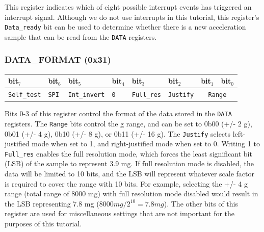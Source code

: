 \documentclass[11pt, twoside, pdftex]{article}
\begin{document}
This register indicates which of eight possible interrupt events has triggered an interrupt signal. Although we do not use interrupts in this tutorial, this register's \texttt{Data\_ready} bit can be used to determine whether there is a new acceleration sample that can be read from the \texttt{DATA} registers.


\subsubsection{DATA\_FORMAT (0x31)}

\begin{table}[h]
    \centering
    \begin{tabular}{|l|l|l|l|l|l|l|l|}
        \hline
            \textbf{bit$_7$}
            & \textbf{bit$_6$}
            & \textbf{bit$_5$}
            & \textbf{bit$_4$}
            & \textbf{bit$_3$}
            & \textbf{bit$_2$}
            & \textbf{bit$_1$}
            & \textbf{bit$_0$}
        \\\hline
            \texttt{Self\_test}
            & \texttt{SPI}
            & \texttt{Int\_invert}
            & \texttt{0}
            & \texttt{Full\_res}
            & \texttt{Justify}
            & \multicolumn{2}{|c|}{\texttt{Range}}
        \\\hline
    \end{tabular}
\end{table}

Bits 0-3 of this register control the format of the data stored in the \texttt{DATA} registers. The \texttt{Range} bits control the g range, and can be set to 0b00 (+/- 2 g), 0b01 (+/- 4 g), 0b10 (+/- 8 g), or 0b11 (+/- 16 g). The \texttt{Justify} selects left-justified mode when set to 1, and right-justified mode when set to 0. Writing 1 to \texttt{Full\_res} enables the full resolution mode, which forces the least significant bit (LSB) of the sample to represent 3.9 mg. If full resolution mode is disabled, the data will be limited to 10 bits, and the LSB will represent whatever scale factor is required to cover the range with 10 bits. For example, selecting the +/- 4 g range (total range of 8000 mg) with full resolution mode disabled would result in the LSB representing 7.8 mg ($8000 mg / 2^{10} = 7.8 mg$). The other bits of this register are used for miscellaneous settings that are not important for the purposes of this tutorial.
\end{document}
